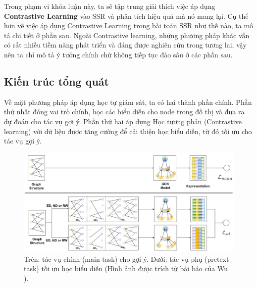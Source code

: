 Trong phạm vi khóa luận này, ta sẽ tập trung giải thích việc áp dụng \textbf{Contrastive Learning} vào SSR và phân tích hiệu quả mà nó mang lại. Cụ thể hơn về việc áp dụng Contrastive Learning trong bài toán SSR như thế nào, ta mô tả chi tiết ở phần sau. Ngoài Contrastive learning, những phương pháp khác vẫn có rất nhiều tiềm năng phát triển và đáng được nghiên cứu trong tương lai, vậy nên ta chỉ mô tả ý tưởng chính chứ không tiếp tục đào sâu ở các phần sau.

\subsection{Kiến trúc tổng quát} \label{3.3.1-general-architecture}

\noindent Về mặt phương pháp áp dụng học tự giám sát, ta có hai thành phần chính. Phần thứ nhất đóng vai trò chính, học các biểu diễn cho node trong đồ thị và đưa ra dự đoán cho tác vụ gợi ý. Phần thứ hai áp dụng Học tương phản (Contrastive learning) với dữ liệu được tăng cường để cải thiện học biểu diễn, từ đó tối ưu cho tác vụ gợi ý.

\begin{figure}[H]
    \centering
    \includegraphics[scale=0.35]{images/Chapter3/sgl.png}
    \caption[Tác vụ chính và phụ của Contrastive learning.]{Trên: tác vụ chính (main task) cho gợi ý. Dưới: tác vụ phụ (pretext task) tối ưu học biểu diễn (Hình ảnh được trích từ bài báo của Wu \cite{SGL}).}
\end{figure}

